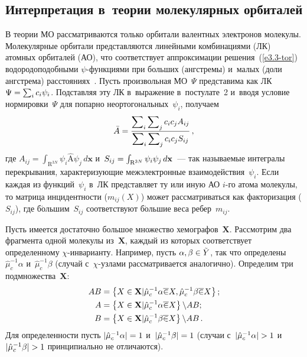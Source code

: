 \begin{multicols}{2}
\section{Интерпретация в~теории молекулярных орбиталей}
    
В теории МО рассматриваются только орбитали 
валентных электронов молекулы. Молекулярные орбитали пред\-став\-ля\-ют\-ся линейными 
комбинациями (ЛК) \mbox{атомных} орбиталей (АО), что соответствует 
аппроксимации решения~(\ref{e3.3-tor}) водородоподобными  
$\psi$-функ\-ци\-ями при больших (ангстремы) и~малых (доли ангстрема) 
расстояниях~\cite{2-tor}. Пусть произвольная МО~$\Psi$ представима как ЛК 
$\Psi\hm= \sum\nolimits_i c_i \psi_i$. Подставляя эту ЛК в~выражение 
в~постулате~2 и~вводя условие нормировки~$\Psi$ для попарно 
неортогональных~$\psi_i$, получаем
\begin{equation*}
\bar{A}=\displaystyle\frac{\displaystyle \sum\nolimits_i \sum\nolimits_j c_i c_j 
{A}_{ij}\mathstrut}{\displaystyle \sum\nolimits_i \sum\nolimits_j c_i c_j S_{ij}\mathstrut}\,,
\end{equation*}
где ${A}_{ij}=\int\nolimits_{\mathrm{R}^{3N}} \psi_i \hat{\mathrm{A}} 
\psi_j\,d\mathbf{x}$ и~${S}_{ij}\hm= \int\nolimits_{\mathrm{R}^{3N}} 
\psi_i \psi_j\,d\mathbf{x}$~--- так называемые интегралы перекрывания, 
характеризующие межэлектронные взаимодействия~$\psi_i$. Если каждая из 
функций~$\psi_i$ в~ЛК представляет ту или иную АО $i$-го атома молекулы, то 
матрица инцидентности ($m_{ij}(X)$) может рассматриваться как факторизация 
(${S}_{ij}$), где б$\acute{\mbox{о}}$льшим~${S}_{ij}$ 
соответствуют б$\acute{\mbox{о}}$льшие веса ребер~$m_{ij}$. 

     
     Пусть имеется достаточно большое множество 
хемографов~$\mathbf{X}$. Рассмотрим два фрагмента одной молекулы 
из~$\mathbf{X}$, каждый из которых соответствует определенному 
$\chi$-ин\-ва\-ри\-ан\-ту. Например, пусть $\alpha,\beta\hm\in \tilde{Y}$, так что 
определены $\hat{\mu}_c^{-1}\alpha$ и~$\hat{\mu}_c^{-1}\beta$ (случай  
с~$\chi$-уз\-ла\-ми рассматривается аналогично). Определим три 
подмножества~$\mathbf{X}$: 
     \begin{align*}
AB&= \left\{ {X}\hm\in 
\mathbf{X}\vert \hat{\mu}_c^{-1}\alpha \overline{\in}{X}, 
\hat{\mu}_c^{-1}\beta \overline{\in}{X}\right\};\\
A&= \left\{ 
{X}\hm\in \mathbf{X}\vert \hat{\mu}_c^{-1}\alpha 
\overline{\in}{X}\right\}\backslash AB;\\ 
B&= \left\{ 
{X}\hm\in \mathbf{X}\vert 
     \hat{\mu}_c^{-1}\beta\overline{\in}{X}\right\}\backslash AB\,. 
     \end{align*}
Для определенности пусть $\vert \hat{\mu}_c^{-1}\alpha\vert \hm=1$ и~$\vert  
\hat{\mu}_c^{-1}\beta\vert \hm=1$ (случаи с~$\vert \hat{\mu}_c^{-1}\alpha\vert 
\hm>1$ и~$\vert \hat{\mu}_c^{-1}\beta\vert \hm>1$ принципиально не 
отличаются).
     

\end{multicols}

